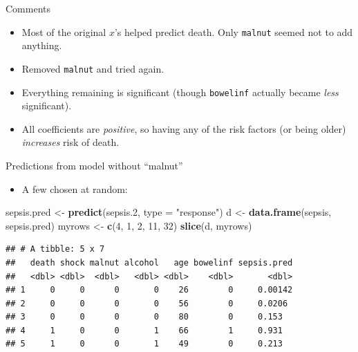 \documentclass[
  ignorenonframetext,
]{beamer}
\newenvironment{Shaded}{\begin{snugshade}}{\end{snugshade}}
\newcommand{\DataTypeTok}[1]{\textcolor[rgb]{0.13,0.29,0.53}{#1}}
\newcommand{\DecValTok}[1]{\textcolor[rgb]{0.00,0.00,0.81}{#1}}
\newcommand{\FloatTok}[1]{\textcolor[rgb]{0.00,0.00,0.81}{#1}}
\newcommand{\KeywordTok}[1]{\textcolor[rgb]{0.13,0.29,0.53}{\textbf{#1}}}
\newcommand{\NormalTok}[1]{#1}
\newcommand{\StringTok}[1]{\textcolor[rgb]{0.31,0.60,0.02}{#1}}
\providecommand{\tightlist}{%
  \setlength{\itemsep}{0pt}\setlength{\parskip}{0pt}}
\begin{document}
\begin{frame}[fragile]{Comments}
\protect\hypertarget{comments-12}{}

\begin{itemize}
\item
  Most of the original \(x\)'s helped predict death. Only
  \texttt{malnut} seemed not to add anything.
\item
  Removed \texttt{malnut} and tried again.
\item
  Everything remaining is significant (though \texttt{bowelinf} actually
  became \emph{less} significant).
\item
  All coefficients are \emph{positive}, so having any of the risk
  factors (or being older) \emph{increases} risk of death.
\end{itemize}

\end{frame}

\begin{frame}[fragile]{Predictions from model without ``malnut''}
\protect\hypertarget{predictions-from-model-without-malnut}{}

\begin{itemize}
\tightlist
\item
  A few chosen at random:
\end{itemize}

\normalsize

\begin{Shaded}
\begin{Highlighting}[]
\NormalTok{sepsis.pred <-}\StringTok{ }\KeywordTok{predict}\NormalTok{(sepsis}\FloatTok{.2}\NormalTok{, }\DataTypeTok{type =} \StringTok{"response"}\NormalTok{)}
\NormalTok{d <-}\StringTok{ }\KeywordTok{data.frame}\NormalTok{(sepsis, sepsis.pred)}
\NormalTok{myrows <-}\StringTok{ }\KeywordTok{c}\NormalTok{(}\DecValTok{4}\NormalTok{, }\DecValTok{1}\NormalTok{, }\DecValTok{2}\NormalTok{, }\DecValTok{11}\NormalTok{, }\DecValTok{32}\NormalTok{)}
\KeywordTok{slice}\NormalTok{(d, myrows)}
\end{Highlighting}
\end{Shaded}

\begin{verbatim}
## # A tibble: 5 x 7
##   death shock malnut alcohol   age bowelinf sepsis.pred
##   <dbl> <dbl>  <dbl>   <dbl> <dbl>    <dbl>       <dbl>
## 1     0     0      0       0    26        0     0.00142
## 2     0     0      0       0    56        0     0.0206 
## 3     0     0      0       0    80        0     0.153  
## 4     1     0      0       1    66        1     0.931  
## 5     1     0      0       1    49        0     0.213
\end{verbatim}

\normalsize

\end{frame}
\end{document}
